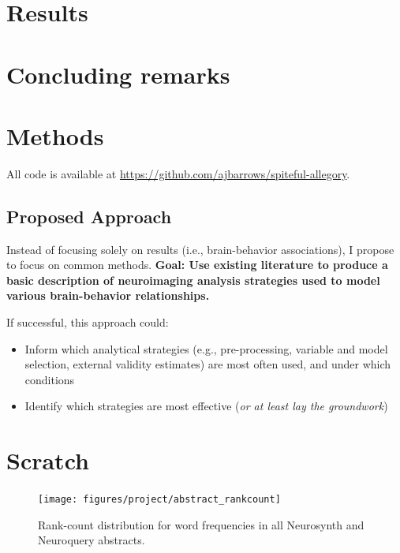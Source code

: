 \section{Results}
\label{sec:papertag.results}


\section{Concluding remarks}
\label{sec:papertag.concludingremarks}


\section{Methods}
\label{sec:papertag.methods}

All code is available at \href{https://github.com/ajbarrows/spiteful-allegory}{https://github.com/ajbarrows/spiteful-allegory}.

\subsection{Proposed Approach}

Instead of focusing solely on results (i.e., brain-behavior associations), I propose to focus on common methods. \textbf{Goal: Use existing literature to produce a basic description of neuroimaging analysis strategies used to model various brain-behavior relationships.} 

If successful, this approach could:
\begin{itemize}
	\item Inform which analytical strategies (e.g., pre-processing, variable and model selection, external validity estimates) are most often used, and under which conditions
	\item Identify which strategies are most effective (\textit{or at least lay the groundwork})
\end{itemize}




\section{Scratch}
\begin{figure}
	\texttt{[image: figures/project/abstract\_rankcount]}
	\caption{Rank-count distribution for word frequencies in all Neurosynth and Neuroquery abstracts.}
\end{figure}


